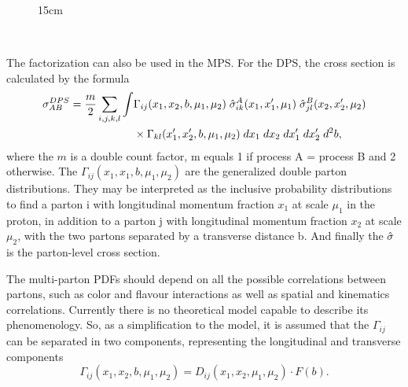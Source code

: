 \begin{figure}[!htm]{15cm}
{{
    }}\\
\end{figure}

The factorization can also be used in the MPS. For the DPS, the cross section is calculated by the formula \cite{gaunt2010double}
\begin{equation}\label{eq:DPSxsecfull}
\begin{split}
    \sigma_{AB}^{DPS} = \frac{m}{2} \sum_{i,j,k,l}\int & \Gamma_{ij}(x_1, x_2, b, \mu_1, \mu_2) \; \Hat{\sigma}^A_{ik}(x_1, x_1^\prime, \mu_1) \; \Hat{\sigma}_{jl}^B(x_2, x_2^\prime, \mu_2) \\ & \times \Gamma_{kl}(x_1^\prime, x_2^\prime, b, \mu_1, \mu_2) \; dx_1\; dx_2\; dx_1^\prime\; dx_2^\prime\; d^2b,
\end{split}
\end{equation}
where the $m$ is a double count factor, m equals 1 if process A = process B and 2 otherwise. The $\Gamma_{ij}(x_1, x_1, b, \mu_1, \mu_2)$ are the generalized double parton distributions. They may be interpreted as the inclusive probability distributions to find a parton i with longitudinal momentum fraction $x_1$ at scale $\mu_1$ in the proton, in addition to a parton j with longitudinal momentum fraction $x_2$ at scale $\mu_2$, with the two partons separated by a transverse distance b. And finally the $\Hat{\sigma}$ is the parton-level cross section.

The multi-parton PDFs should depend on all the possible correlations between partons, such as color and flavour interactions as well as spatial and kinematics correlations. Currently there is no theoretical model capable to describe its phenomenology. So, as a simplification to the model, it is assumed that the $\Gamma_{ij}$ can be separated in two components, representing the longitudinal and transverse components
\begin{equation}
    \Gamma_{ij}(x_1, x_2, b, \mu_1, \mu_2) = D_{ij}(x_1, x_2, \mu_1, \mu_2)\cdot F(b).
\end{equation}

